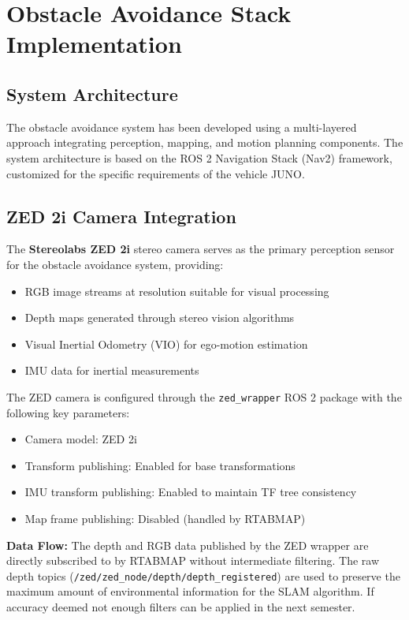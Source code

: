 \section{Obstacle Avoidance Stack Implementation}

\subsection{System Architecture}
The obstacle avoidance system has been developed using a multi-layered approach integrating perception, mapping, and motion planning components. The system architecture is based on the ROS 2 Navigation Stack (Nav2) framework, customized for the specific requirements of the vehicle JUNO.

\subsection{ZED 2i Camera Integration}
The \textbf{Stereolabs ZED 2i} stereo camera serves as the primary perception sensor for the obstacle avoidance system, providing:
\begin{itemize}
    \item RGB image streams at resolution suitable for visual processing
    \item Depth maps generated through stereo vision algorithms
    \item Visual Inertial Odometry (VIO) for ego-motion estimation
    \item IMU data for inertial measurements
\end{itemize}

The ZED camera is configured through the \texttt{zed\_wrapper} ROS 2 package with the following key parameters:
\begin{itemize}
    \item Camera model: ZED 2i
    \item Transform publishing: Enabled for base transformations
    \item IMU transform publishing: Enabled to maintain TF tree consistency
    \item Map frame publishing: Disabled (handled by RTABMAP)
\end{itemize}

\textbf{Data Flow:} The depth and RGB data published by the ZED wrapper are directly subscribed to by RTABMAP without intermediate filtering. The raw depth topics (\texttt{/zed/zed\_node/depth/depth\_registered}) are used to preserve the maximum amount of environmental information for the SLAM algorithm. If accuracy deemed not enough filters can be applied in the next semester.

